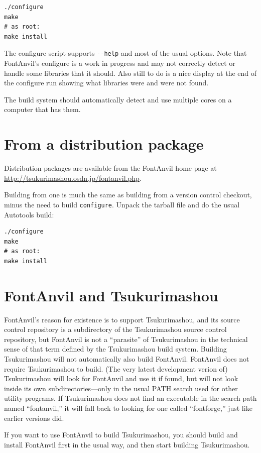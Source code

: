 \documentclass[11pt]{report}
\begin{document}
\begin{verbatim}
./configure
make
# as root:
make install
\end{verbatim}

The configure script supports \texttt{-{}-help} and most of the usual
options.
Note that FontAnvil's configure is a work in progress and may not correctly
detect or handle some libraries that it should.  Also still to do is a nice
display at the end of the configure run showing what libraries were and were
not found.

The build system should automatically detect and use multiple cores on a
computer that has them.

\section{From a distribution package}

Distribution packages are available from the FontAnvil home page at
\url{http://tsukurimashou.osdn.jp/fontanvil.php}.

Building from one is much the same as building from a version control
checkout, minus the need to build \texttt{configure}.  Unpack the tarball
file and do the usual Autotools build:

\begin{verbatim}
./configure
make
# as root:
make install
\end{verbatim}

\section{FontAnvil and Tsukurimashou}

FontAnvil's reason for existence is to support Tsukurimashou, and its source
control repository is a subdirectory of the Tsukurimashou source control
repository, but FontAnvil is not a ``parasite'' of Tsukurimashou in the
technical sense of that term defined by the Tsukurimashou build system. 
Building Tsukurimashou will not automatically also build FontAnvil.
FontAnvil does not require Tsukurimashou to build.  (The very latest
development verion of) Tsukurimashou will look
for FontAnvil and use it if found, but will not look inside its own
subdirectories---only in the usual PATH search used for other utility
programs.  If Tsukurimashou does not find an executable in the search path
named ``fontanvil,'' it will fall back to looking for one called
``fontforge,'' just like earlier versions did.

If you want to use FontAnvil to build Tsukurimashou, you should build and
install FontAnvil first in the usual way, and then start building
Tsukurimashou.
\end{document}
